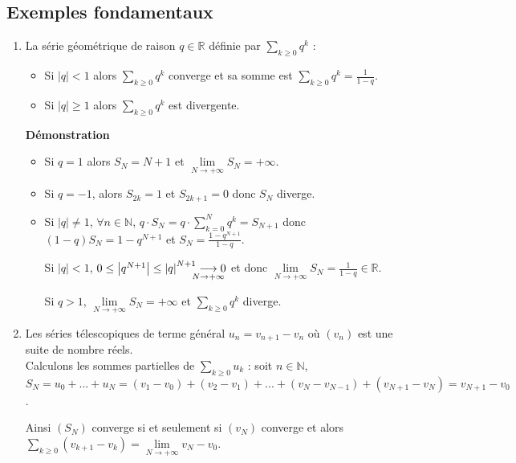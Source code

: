 \documentclass[a4paper,10pt]{book} %
\newcommand{\R}{\mathbb{R}}
\newcommand{\N}{\mathbb{N}}
\newcommand{\abs}[1]{\left|#1\right|}
\newcommand{\displayAmath}{\displaystyle}
\newcommand{\lime}[4]{#1\underset{\mathclap{#2 \rightarrow #3}}{\longrightarrow} #4}
\begin{document}
\subsection{Exemples fondamentaux}
\begin{enumerate}
\item La série géométrique de raison $q\in\R$ définie par  $\displayAmath\sum_{k\geq 0}q^k$ :
\begin{itemize}
\item Si $\abs{q}<1$ alors $\displayAmath\sum_{k\geq 0}q^k$ converge et sa somme est $\displayAmath\sum_{k\geq 0} q^k=\frac{1}{1-q}$.

\item Si $\abs{q}\geq 1$ alors $\displayAmath\sum_{k\geq 0}q^k$ est divergente.
\end{itemize}

\smallskip\textbf{Démonstration}
\begin{itemize}
\item Si $q=1$ alors $S_N=N+1$ et $\lim\limits_{N\rightarrow +\infty}S_N=+\infty$.

\item Si $q=-1$, alors $S_{2k}=1$ et $S_{2k+1}=0$ donc $S_N$ diverge.

\item Si $\abs{q}\neq 1$, $\forall n\in \N$, $\displayAmath q\cdot S_N=q\cdot\sum_{k=0}^{N}q^k=S_{N+1}$ donc $(1-q)S_N=1-q^{N+1}$ et $S_N=\frac{1-q^{N+1}}{1-q}$.

Si $\abs{q}<1$, $0\leq \abs{q^{N+1}}\leq \lime{\abs{q}^{N+1}}{N}{+\infty}{0}$ et donc $\lim\limits_{N\rightarrow +\infty}S_N=\frac{1}{1-q}\in\R$.

Si $q>1$, $\lim\limits_{N\rightarrow+\infty}S_N=+\infty$ et $\displayAmath\sum_{k\geq 0} q^k$ diverge.
\end{itemize}

\item Les séries télescopiques de terme général $u_n=v_{n+1}-v_n$ où $(v_n)$ est une suite de nombre réels.\\

Calculons les sommes partielles de $\displayAmath\sum_{k\geq 0}u_k$ : soit $n\in\N$,\\ $S_N=u_0+...+u_N=(v_1-v_0)+(v_2-v_1)+...+(v_N-v_{N-1})+(v_{N+1}-v_N)=v_{N+1}-v_0$.

Ainsi $(S_N)$ converge si et seulement si $(v_N)$ converge et alors  $\displayAmath\sum_{k\geq 0}(v_{k+1}-v_k)=\lim\limits_{N\rightarrow +\infty}v_N-v_0$.
\end{enumerate}
\end{document}
